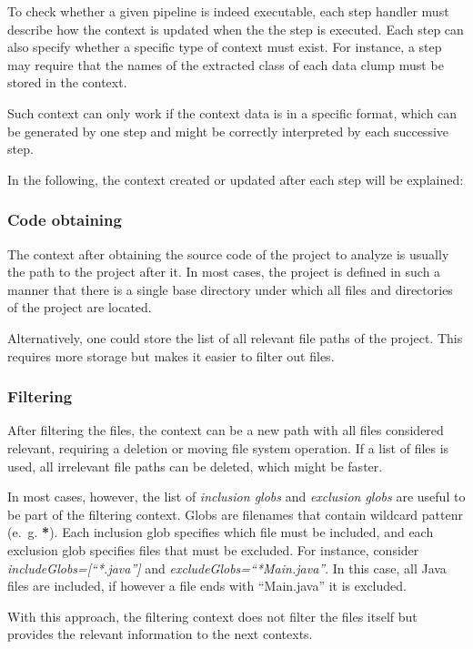 To check whether a given pipeline is indeed executable, each step handler must describe how the context is updated when the the step is executed. Each step can also specify whether a specific type of context must exist. For instance, a step may require that the names of the extracted class of each data clump must be stored in the context.  

Such context can only work if the context data is in a specific format, which can be generated by one step and might be correctly interpreted by each successive step. 

In the following, the context created or updated after each step will be explained:

\subsubsection{Code obtaining}
The context after obtaining the source code of the project to analyze is usually the path to the project after it. In most cases, the project is defined in such a manner that there is a single base directory under which all files and directories of the project are located.

Alternatively, one could store the list of all relevant file paths of the project. This requires more storage but makes it easier to filter out files. 

\subsubsection{Filtering}
After filtering the files, the context can be a new path with all files considered relevant, requiring a deletion or moving file system operation. If a list of files is used, all irrelevant file paths can be deleted, which might be faster.

In most cases, however, the list of \textit{inclusion globs} and \textit{exclusion globs} are useful to be part of the filtering context. Globs are filenames that contain wildcard pattenr (e.~g. \textbf{*}). Each inclusion glob specifies which file must be included, and each exclusion glob specifies files that must be excluded. For instance, consider \textit{includeGlobs=[\enquote{*.java}]} and \textit{excludeGlobs=\enquote{*Main.java}}. In this case, all Java files are included, if however a file ends with \enquote{Main.java} it is excluded.

With this approach, the filtering context does not filter the files itself but provides the relevant information to the next contexts. 

